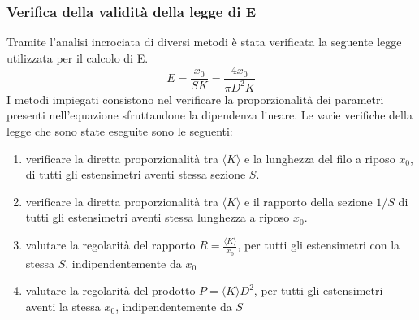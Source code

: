 \documentclass[a4paper,11pt,oneside]{article}
\begin{document}
\begin{figure}[h!]
    \centering
    \newline
\end{figure}

\begin{figure}[h!]
    \centering
    \newline
    \newline
\end{figure}

\newpage
\subsubsection*{Verifica della validità della legge di E}
Tramite l'analisi incrociata di diversi metodi è stata verificata la seguente legge utilizzata per il calcolo di E.
\begin{equation}
    \label{equation:legge_e}
    E=\frac{x_0}{S K}=\frac{4 x_0}{\pi D^{2}K}
\end{equation}
I metodi impiegati consistono nel verificare la proporzionalità dei parametri presenti nell'equazione sfruttandone la dipendenza lineare. Le varie verifiche della legge che sono state eseguite sono le seguenti:
\begin{enumerate}
    \item verificare la diretta proporzionalità tra $\langle K \rangle$ e la lunghezza del filo a riposo $x_0$, di tutti gli estensimetri aventi stessa sezione $S$.
    \item verificare la diretta proporzionalità tra $\langle K \rangle$ e il rapporto della sezione $1/S$ di tutti gli estensimetri aventi stessa lunghezza a riposo $x_{0}$.
    \item valutare la regolarità del rapporto $R=\frac{\langle K \rangle}{x_{0}}$, per tutti gli estensimetri con la stessa $S$, indipendentemente da $x_{0}$
    \item valutare la regolarità del prodotto $P={ \langle K \rangle} D^2 $, per tutti gli estensimetri aventi la stessa $x_{0}$, indipendentemente da $S$
\end{enumerate}
\end{document}
